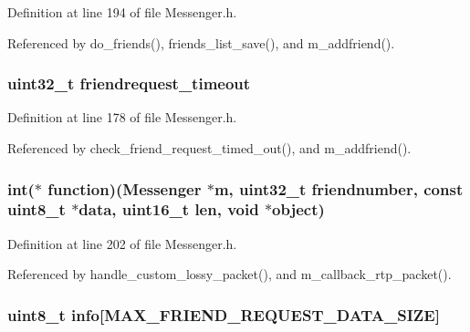 Definition at line 194 of file Messenger.\+h.



Referenced by do\+\_\+friends(), friends\+\_\+list\+\_\+save(), and m\+\_\+addfriend().

\hypertarget{struct_friend_a671d1f4ab926cb9dc297c3f2743560d4}{
\subsubsection[{friendrequest\+\_\+timeout}]{\setlength{\rightskip}{0pt plus 5cm}uint32\+\_\+t friendrequest\+\_\+timeout}}\label{struct_friend_a671d1f4ab926cb9dc297c3f2743560d4}


Definition at line 178 of file Messenger.\+h.



Referenced by check\+\_\+friend\+\_\+request\+\_\+timed\+\_\+out(), and m\+\_\+addfriend().

\hypertarget{struct_friend_a726a4dcb820b33fd434494d56f532867}{
\subsubsection[{function}]{\setlength{\rightskip}{0pt plus 5cm}int($\ast$ function)({\bf Messenger} $\ast${\bf m}, uint32\+\_\+t friendnumber, const uint8\+\_\+t $\ast$data, uint16\+\_\+t len, void $\ast${\bf object})}}\label{struct_friend_a726a4dcb820b33fd434494d56f532867}


Definition at line 202 of file Messenger.\+h.



Referenced by handle\+\_\+custom\+\_\+lossy\+\_\+packet(), and m\+\_\+callback\+\_\+rtp\+\_\+packet().

\hypertarget{struct_friend_ae1a1264e17ce4eedae67c283a09236e6}{
\subsubsection[{info}]{\setlength{\rightskip}{0pt plus 5cm}uint8\+\_\+t info\mbox{[}{\bf M\+A\+X\+\_\+\+F\+R\+I\+E\+N\+D\+\_\+\+R\+E\+Q\+U\+E\+S\+T\+\_\+\+D\+A\+T\+A\+\_\+\+S\+I\+Z\+E}\mbox{]}}}\label{struct_friend_ae1a1264e17ce4eedae67c283a09236e6}


